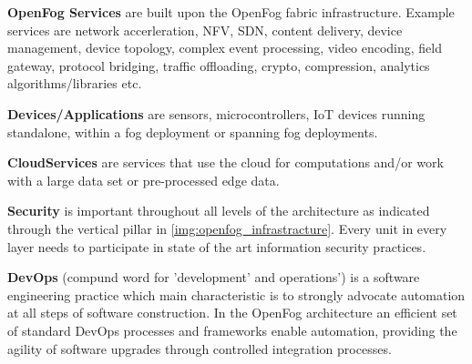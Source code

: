 \textbf{OpenFog Services} are built upon the OpenFog fabric infrastructure. Example services are network accerleration, NFV, SDN, content delivery, device management, device topology, complex event processing, video encoding, field gateway, protocol bridging, traffic offloading, crypto, compression, analytics algorithms/libraries etc.\cite[p. 8]{OpenFog}

\textbf{Devices/Applications} are sensors, microcontrollers, IoT devices running standalone, within a fog deployment or spanning fog deployments.\cite[p. 8]{OpenFog}
 
\textbf{CloudServices} are services that use the cloud for computations and/or work with a large data set or pre-processed edge data.\cite[p. 8]{OpenFog}

\textbf{Security} is important throughout all levels of the architecture as indicated through the vertical pillar in \autoref{img:openfog_infrastracture}. Every unit in every layer needs to participate in state of the art information security practices.\cite[p. 8]{OpenFog}

\textbf{DevOps} (compund word for 'development' and operations') is a software engineering practice which main characteristic is to strongly advocate automation at all steps of software construction. In the OpenFog architecture an efficient set of standard DevOps processes and frameworks enable automation, providing the agility of software upgrades through controlled integration processes.\cite[p. 9]{OpenFog}